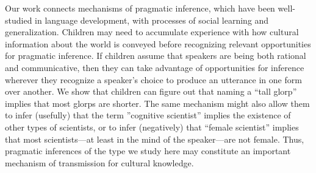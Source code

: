 \documentclass[man]{apa2}
\begin{document}

Our work connects mechanisms of pragmatic inference, which have been well-studied in language development, with processes of social learning and generalization.  Children may need to accumulate experience with how cultural information about the world is conveyed before recognizing relevant opportunities for pragmatic inference. 
 If children assume that speakers are being both rational and communicative, then they can take advantage of opportunities for inference wherever they recognize a speaker's choice to produce an utterance in one form over another.  We show that children can figure out that naming a ``tall glorp'' implies that most glorps are shorter. The same mechanism might also allow them to infer (usefully) that the term ''cognitive scientist'' implies the existence of other types of scientists, or to infer (negatively) that ``female scientist'' implies that most scientists---at least in the mind of the speaker---are not female. Thus, pragmatic inferences of the type we study here may constitute an important mechanism of transmission for cultural knowledge.



\end{document}
